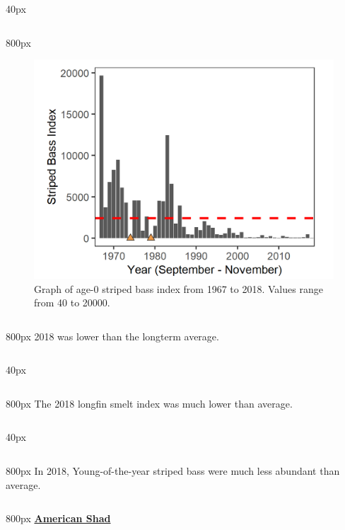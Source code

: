 \documentclass[
]{book}
\begin{document}
\begin{column}{40px\textwidth}
~
\end{column}

\begin{column}{800px\textwidth}
\begin{figure}
\includegraphics[width=15.25in]{figures/FMWT_sb0_1966} \caption{Graph of age-0 striped bass index from 1967 to 2018. Values range from 40 to 20000.}\label{fig:unnamed-chunk-126}
\end{figure}
\end{column}

\begin{column}{800px\textwidth}
2018 was lower than the longterm average.
\end{column}

\begin{column}{40px\textwidth}
~
\end{column}

\begin{column}{800px\textwidth}
The 2018 longfin smelt index was much lower than average.
\end{column}

\begin{column}{40px\textwidth}
~
\end{column}

\begin{column}{800px\textwidth}
In 2018, Young-of-the-year striped bass were much less abundant than average.
\end{column}

\begin{column}{800px\textwidth}
\textbf{\href{http://calfish.ucdavis.edu/species/?uid=3\&ds=698}{American Shad}}
\end{column}
\end{document}
